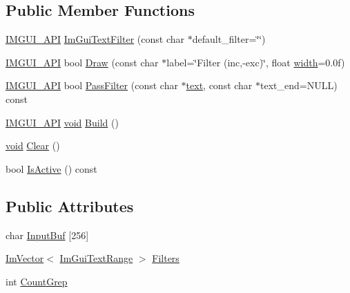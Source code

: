 \subsection*{Public Member Functions}
\begin{DoxyCompactItemize}
\item 
\hyperlink{imgui_8h_a43829975e84e45d1149597467a14bbf5}{I\+M\+G\+U\+I\+\_\+\+A\+PI} \hyperlink{structImGuiTextFilter_a0a61ee76f0b4f3c354791734b06e3140}{Im\+Gui\+Text\+Filter} (const char $\ast$default\+\_\+filter=\char`\"{}\char`\"{})
\item 
\hyperlink{imgui_8h_a43829975e84e45d1149597467a14bbf5}{I\+M\+G\+U\+I\+\_\+\+A\+PI} bool \hyperlink{structImGuiTextFilter_ab93ad5985019ff9d3781606551fc26cc}{Draw} (const char $\ast$label=\char`\"{}Filter (inc,-\/exc)\char`\"{}, float \hyperlink{imgui__impl__opengl3__loader_8h_a6879d830f164725df67adeeabca3ea47}{width}=0.\+0f)
\item 
\hyperlink{imgui_8h_a43829975e84e45d1149597467a14bbf5}{I\+M\+G\+U\+I\+\_\+\+A\+PI} bool \hyperlink{structImGuiTextFilter_a88d73ff8b81fbbd0a129b1bf3498d8aa}{Pass\+Filter} (const char $\ast$\hyperlink{game__play__state_8cpp_a295b62c787445f811e691da4b10f6be4}{text}, const char $\ast$text\+\_\+end=N\+U\+LL) const
\item 
\hyperlink{imgui_8h_a43829975e84e45d1149597467a14bbf5}{I\+M\+G\+U\+I\+\_\+\+A\+PI} \hyperlink{imgui__impl__opengl3__loader_8h_ac668e7cffd9e2e9cfee428b9b2f34fa7}{void} \hyperlink{structImGuiTextFilter_aef362baafaa9dfa62d11bc6101c0f4c1}{Build} ()
\item 
\hyperlink{imgui__impl__opengl3__loader_8h_ac668e7cffd9e2e9cfee428b9b2f34fa7}{void} \hyperlink{structImGuiTextFilter_a9043c1f0c33d29e6fc9b75ae81f9705a}{Clear} ()
\item 
bool \hyperlink{structImGuiTextFilter_a493158f2ab8f45fcf303c3f953be9b88}{Is\+Active} () const
\end{DoxyCompactItemize}
\subsection*{Public Attributes}
\begin{DoxyCompactItemize}
\item 
char \hyperlink{structImGuiTextFilter_ad070acb1038199dd4e8f5d010c5cb5ba}{Input\+Buf} \mbox{[}256\mbox{]}
\item 
\hyperlink{structImVector}{Im\+Vector}$<$ \hyperlink{structImGuiTextFilter_1_1ImGuiTextRange}{Im\+Gui\+Text\+Range} $>$ \hyperlink{structImGuiTextFilter_a39ed87cfdf3cb0cdb8389b017bb00067}{Filters}
\item 
int \hyperlink{structImGuiTextFilter_ac31839c319fe4211c21fc143b7249f86}{Count\+Grep}
\end{DoxyCompactItemize}


